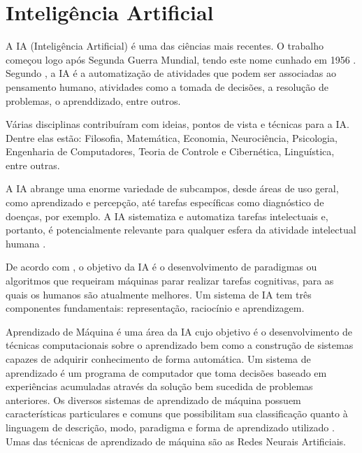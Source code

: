 \documentclass[
	12pt,				%
	openright,			%
	oneside,
	a4paper,			%
	english,			%
	french,				%
	spanish,			%
	brazil,				%
	]{abntex2}
\begin{document}
\section{Inteligência Artificial}
\label{sec:IA}
A IA (Inteligência Artificial) é uma das ciências mais recentes. O trabalho começou logo após Segunda Guerra Mundial, tendo este nome cunhado em 1956 \cite{russell2004inteligencia}. Segundo , a IA é a automatização de atividades que podem ser associadas ao pensamento humano, atividades como a tomada de decisões, a resolução de problemas, o aprenddizado, entre outros.

Várias disciplinas contribuíram com ideias, pontos de vista e técnicas para a IA. Dentre elas estão: Filosofia, Matemática, Economia, Neurociência, Psicologia, Engenharia de Computadores, Teoria de Controle e Cibernética, Linguística, entre outras. \cite{russell2004inteligencia}

A IA abrange uma enorme variedade de subcampos, desde áreas de uso geral, como aprendizado e percepção, até tarefas específicas como diagnóstico de doenças, por exemplo. A IA sistematiza e automatiza tarefas intelectuais e, portanto, é potencialmente relevante para qualquer esfera da atividade intelectual humana  \cite{russell2004inteligencia}.

De acordo com , o objetivo da IA é o desenvolvimento de paradigmas ou algoritmos que requeiram máquinas parar realizar tarefas cognitivas, para as quais os humanos são atualmente melhores. Um sistema de IA tem três componentes fundamentais: representação, raciocínio e aprendizagem.

Aprendizado de Máquina é uma área da IA cujo objetivo é o desenvolvimento de técnicas computacionais sobre o aprendizado bem como a construção de sistemas capazes de adquirir conhecimento de forma automática. Um sistema de aprendizado é um programa de computador que toma decisões baseado em experiências acumuladas através da solução bem sucedida de problemas anteriores. Os diversos sistemas de aprendizado de máquina possuem características particulares e comuns que possibilitam sua classificação quanto à linguagem de descrição, modo, paradigma e forma de aprendizado utilizado \cite{monard2003sistemas}.
Umas das técnicas de aprendizado de máquina são as Redes Neurais Artificiais.

\end{document}
